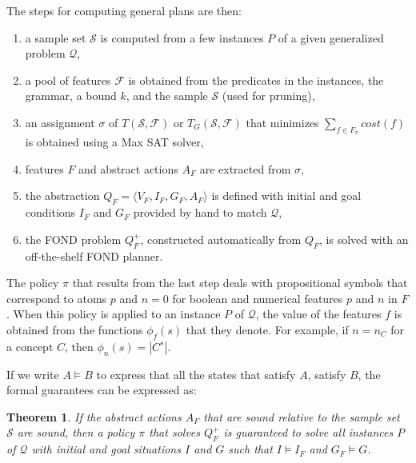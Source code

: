 \documentclass[letterpaper]{article} %
\newcommand{\tup}[1]{\langle #1 \rangle}
\newtheorem{theorem}[definition]{Theorem}
\newcommand{\Q}{\mathcal{Q}}
\newcommand{\F}{\mathcal{F}}
\renewcommand{\S}{\mathcal{S}}
\begin{document}
The steps for computing general plans are then:
\begin{enumerate}[1.]
  \item a sample set $\S$ is computed from a few instances $P$ of a given
    generalized problem $\Q$,
  \item a pool of features $\F$ is obtained from the predicates in the instances, %
    the grammar, a  bound $k$, and the sample $\S$ (used for
    pruning),
  \item an assignment $\sigma$ of $T(\S,\F)$ or $T_G(\S,\F)$
    that minimizes $\sum_{f \in F_{\sigma}} cost(f)$ is obtained using a
    Max SAT solver,
  \item features $F$ and abstract actions $A_F$ are extracted from $\sigma$,
  \item the abstraction $Q_F=\tup{V_F,I_F,G_F,A_F}$ is defined with initial and goal
    conditions $I_F$ and $G_F$ provided by hand to match $\Q$, 
  \item the FOND problem $Q^+_F$, constructed automatically from $Q_F$, is solved with an off-the-shelf
    FOND planner.
\end{enumerate}

The policy $\pi$ that results from the last step deals with propositional symbols that correspond to atoms $p$ and $n=0$ for boolean
and numerical features $p$ and $n$ in $F$. When this policy is applied to an instance $P$ of $\Q$, the  value of the features $f$
is obtained from the functions $\phi_f(s)$ that they denote. For example, if $n=n_C$ for a concept $C$, then $\phi_{n}(s)=|C^s|$.

If we write $A \vDash B$ to express that all the states that satisfy $A$, satisfy $B$, 
the formal guarantees can be expressed as:

\begin{theorem}
If the abstract actions $A_F$ that are sound relative to the sample set $\S$  are  sound,
then a   policy $\pi$ that solves  $Q^+_F$  is guaranteed to solve  all instances $P$ of $\Q$
with initial and goal situations $I$ and $G$ such that $I \vDash  I_F$ and $G_F \vDash G$.
\end{theorem}

\end{document}
